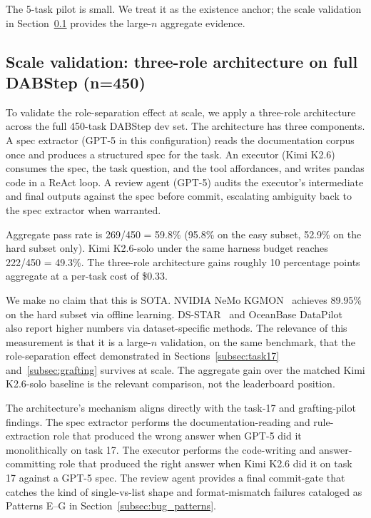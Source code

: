 \documentclass[conference]{IEEEtran}
\newcommand{\Kimi}{Kimi K2.6}
\begin{document}
The 5-task pilot is small. We treat it as the existence anchor; the scale validation in Section~\ref{subsec:scribe} provides the large-$n$ aggregate evidence.

\subsection{Scale validation: three-role architecture on full DABStep (n=450)}
\label{subsec:scribe}

To validate the role-separation effect at scale, we apply a three-role architecture across the full 450-task DABStep dev set. The architecture has three components. A spec extractor (GPT-5 in this configuration) reads the documentation corpus once and produces a structured spec for the task. An executor (\Kimi{}) consumes the spec, the task question, and the tool affordances, and writes pandas code in a ReAct loop. A review agent (GPT-5) audits the executor's intermediate and final outputs against the spec before commit, escalating ambiguity back to the spec extractor when warranted.

Aggregate pass rate is 269/450 = 59.8\% (95.8\% on the easy subset, 52.9\% on the hard subset only). \Kimi{}-solo under the same harness budget reaches 222/450 = 49.3\%. The three-role architecture gains roughly 10 percentage points aggregate at a per-task cost of \$0.33.

We make no claim that this is SOTA. NVIDIA NeMo KGMON~\cite{nemoKgmon2025} achieves 89.95\% on the hard subset via offline learning. DS-STAR~\cite{dsStar2025} and OceanBase DataPilot~\cite{oceanbaseDataPilot2025} also report higher numbers via dataset-specific methods. The relevance of this measurement is that it is a large-$n$ validation, on the same benchmark, that the role-separation effect demonstrated in Sections~\ref{subsec:task17} and~\ref{subsec:grafting} survives at scale. The aggregate gain over the matched \Kimi{}-solo baseline is the relevant comparison, not the leaderboard position.

The architecture's mechanism aligns directly with the task-17 and grafting-pilot findings. The spec extractor performs the documentation-reading and rule-extraction role that produced the wrong answer when GPT-5 did it monolithically on task 17. The executor performs the code-writing and answer-committing role that produced the right answer when \Kimi{} did it on task 17 against a GPT-5 spec. The review agent provides a final commit-gate that catches the kind of single-vs-list shape and format-mismatch failures cataloged as Patterns E--G in Section~\ref{subsec:bug_patterns}.
\end{document}
